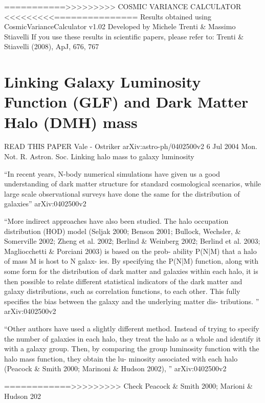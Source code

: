 ===========>>>>>>>>> COSMIC VARIANCE CALCULATOR <<<<<<<<<===============
Results obtained using CosmicVarianceCalculator v1.02 
Developed by Michele Trenti \& Massimo Stiavelli 
If you use these results in scientific papers, please refer to:  
Trenti \& Stiavelli (2008), ApJ, 676, 767 


\section{Linking Galaxy Luminosity Function (GLF) and
  Dark Matter Halo (DMH) mass}

READ THIS PAPER
Vale - Ostriker
arXiv:astro-ph/0402500v2 6 Jul 2004
Mon. Not. R. Astron. Soc.
Linking halo mass to galaxy luminosity

``In recent years, N-body numerical simulations have given us
a good understanding of dark matter structure for standard
cosmological scenarios, while large scale observational
surveys have done the same for the distribution of galaxies'' arXiv:0402500v2

``More indirect approaches have also been studied.
The halo occupation distribution (HOD) model (Seljak
2000; Benson 2001; Bullock, Wechsler, \& Somerville 2002;
Zheng et al. 2002; Berlind \& Weinberg 2002; Berlind et al.
2003; Magliocchetti \& Porciani 2003) is based on the prob-
ability P(N|M) that a halo of mass M is host to N galax-
ies. By specifying the P(N|M) function, along with some
form for the distribution of dark matter and galaxies within
each halo, it is then possible to relate different statistical
indicators of the dark matter and galaxy distributions, such
as correlation functions, to each other. This fully specifies
the bias between the galaxy and the underlying matter dis-
tributions. '' arXiv:0402500v2


``Other authors have used a slightly different method.
Instead of trying to specify the number of galaxies in each
halo, they treat the halo as a whole and identify it with
a galaxy group. Then, by comparing the group luminosity
function with the halo mass function, they obtain the lu-
minosity associated with each halo (Peacock \& Smith 2000;
Marinoni \& Hudson 2002), '' arXiv:0402500v2

============>>>>>>>>> Check Peacock \& Smith 2000; Marioni \& Hudson 202






